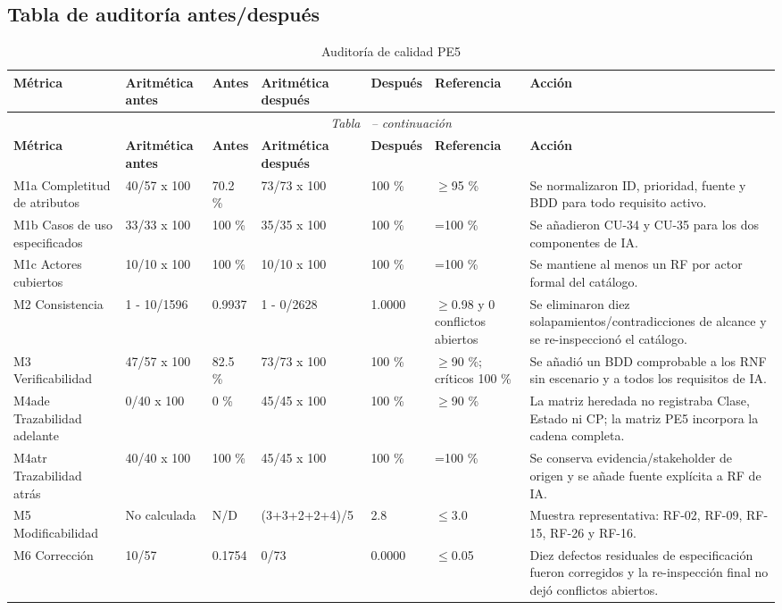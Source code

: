 \documentclass[11pt,a4paper]{article}
\begin{document}
	\subsection{Tabla de auditoría antes/después}
	\scriptsize
	\begin{longtable}{p{2.5cm}p{1.9cm}p{1.3cm}p{1.9cm}p{1.3cm}p{1.5cm}p{4.1cm}}
		\caption{Auditoría de calidad PE5}\label{tab:auditoria}\\
		\toprule
		\textbf{Métrica}&\textbf{Aritmética antes}&\textbf{Antes}&\textbf{Aritmética después}&\textbf{Después}&\textbf{Referencia}&\textbf{Acción}\\\midrule
		\endfirsthead
		\multicolumn{7}{c}{\small\textit{Tabla \thetable\ -- continuación}}\\
		\toprule
		\textbf{Métrica}&\textbf{Aritmética antes}&\textbf{Antes}&\textbf{Aritmética después}&\textbf{Después}&\textbf{Referencia}&\textbf{Acción}\\\midrule
		\endhead
		M1a Completitud de atributos & 40/57 x 100 & 70.2 \% & 73/73 x 100 & 100 \% & $\geq$95 \% & Se normalizaron ID, prioridad, fuente y BDD para todo requisito activo.\\
		M1b Casos de uso especificados & 33/33 x 100 & 100 \% & 35/35 x 100 & 100 \% & =100 \% & Se añadieron CU-34 y CU-35 para los dos componentes de IA.\\
		M1c Actores cubiertos & 10/10 x 100 & 100 \% & 10/10 x 100 & 100 \% & =100 \% & Se mantiene al menos un RF por actor formal del catálogo.\\
		M2 Consistencia & 1 - 10/1596 & 0.9937 & 1 - 0/2628 & 1.0000 & $\geq$0.98 y 0 conflictos abiertos & Se eliminaron diez solapamientos/contradicciones de alcance y se re-inspeccionó el catálogo.\\
		M3 Verificabilidad & 47/57 x 100 & 82.5 \% & 73/73 x 100 & 100 \% & $\geq$90 \%; críticos 100 \% & Se añadió un BDD comprobable a los RNF sin escenario y a todos los requisitos de IA.\\
		M4ade Trazabilidad adelante & 0/40 x 100 & 0 \% & 45/45 x 100 & 100 \% & $\geq$90 \% & La matriz heredada no registraba Clase, Estado ni CP; la matriz PE5 incorpora la cadena completa.\\
		M4atr Trazabilidad atrás & 40/40 x 100 & 100 \% & 45/45 x 100 & 100 \% & =100 \% & Se conserva evidencia/stakeholder de origen y se añade fuente explícita a RF de IA.\\
		M5 Modificabilidad & No calculada & N/D & (3+3+2+2+4)/5 & 2.8 & $\leq$3.0 & Muestra representativa: RF-02, RF-09, RF-15, RF-26 y RF-16.\\
		M6 Corrección & 10/57 & 0.1754 & 0/73 & 0.0000 & $\leq$0.05 & Diez defectos residuales de especificación fueron corregidos y la re-inspección final no dejó conflictos abiertos.\\
		\bottomrule\end{longtable}
	\normalsize
	
\end{document}
